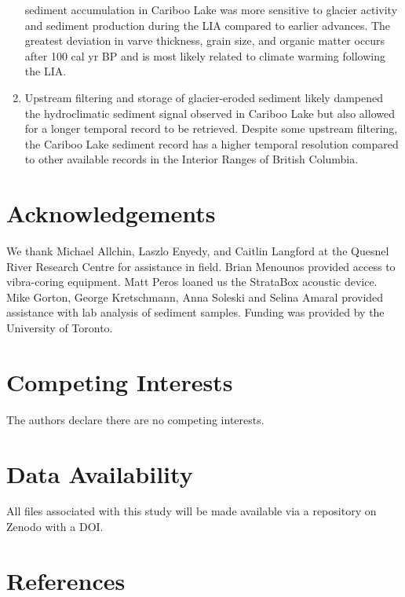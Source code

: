 \documentclass[
  letterpaper,
  DIV=11,
  numbers=noendperiod]{scrartcl}
\begin{document}
\begin{enumerate}
  sediment accumulation in Cariboo Lake was more sensitive to glacier
  activity and sediment production during the LIA compared to earlier
  advances. The greatest deviation in varve thickness, grain size, and
  organic matter occurs after 100 cal yr BP and is most likely related
  to climate warming following the LIA.
\item
  Upstream filtering and storage of glacier-eroded sediment likely
  dampened the hydroclimatic sediment signal observed in Cariboo Lake
  but also allowed for a longer temporal record to be retrieved. Despite
  some upstream filtering, the Cariboo Lake sediment record has a higher
  temporal resolution compared to other available records in the
  Interior Ranges of British Columbia.
\end{enumerate}

\pagebreak

\hypertarget{acknowledgements}{%
\section{Acknowledgements}\label{acknowledgements}}

We thank Michael Allchin, Laszlo Enyedy, and Caitlin Langford at the
Quesnel River Research Centre for assistance in field. Brian Menounos
provided access to vibra-coring equipment. Matt Peros loaned us the
StrataBox acoustic device. Mike Gorton, George Kretschmann, Anna Soleski
and Selina Amaral provided assistance with lab analysis of sediment
samples. Funding was provided by the University of Toronto.

\hypertarget{competing-interests}{%
\section{Competing Interests}\label{competing-interests}}

The authors declare there are no competing interests.

\hypertarget{data-availability}{%
\section{Data Availability}\label{data-availability}}

All files associated with this study will be made available via a
repository on Zenodo with a DOI.

\pagebreak

\hypertarget{references}{%
\section{References}\label{references}}
\end{document}
